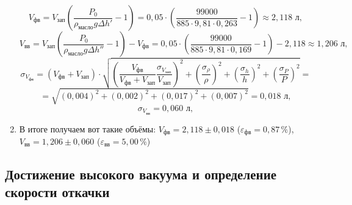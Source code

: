 \documentclass[a4paper,12pt]{article}
\begin{document}
\begin{enumerate}
    \begin{equation*}
    	V_\text{фв} = V_{\text{зап}} \left( \frac{P_0}{\rho_{\text{масло}} g \Delta h'} - 1 \right) = 0{,}05 \cdot \left( \frac{99000}{885 \cdot 9{,}81 \cdot 0{,}263} - 1 \right) \approx 2{,}118 \text{ л},
    \end{equation*}
    \begin{equation*}
    	V_\text{вв} = V_{\text{зап}} \left( \frac{P_0}{\rho_{\text{масло}} g \Delta h''} - 1 \right) - V_\text{фв} = 0{,}05 \cdot \left( \frac{99000}{885 \cdot 9{,}81 \cdot 0{,}169} - 1 \right) - 2{,}118 \approx  1{,}206 \text{ л},
    \end{equation*}
    \begin{equation*}
    \sigma_{V_\text{фв}} = \left(V_\text{фв} + V_{\text{зап}}\right) \cdot \sqrt{ \left( \frac{V_\text{фв}}{V_\text{фв} + V_{\text{зап}}} \frac{\sigma_{V_{\text{зап}}}}{V_{\text{зап}}} \right)^2 + \left( \frac{\sigma_\rho}{\rho} \right)^2 + \left( \frac{\sigma_h}{h} \right)^2 + \left( \frac{\sigma_P}{P} \right)^2 } =
    \end{equation*}
    \begin{equation*}
    = \sqrt{ \left( 0{,}004 \right)^2 + \left( 0{,}002 \right)^2 + \left( 0{,}017 \right)^2 + \left( 0{,}007 \right)^2 } = 0{,}018 \text{ л},
    \end{equation*}
    \begin{equation*}
    \sigma_{V_\text{вв}}  = 0{,}060 \text{ л},
    \end{equation*}
    
    \item В итоге получаем вот такие объёмы: $V_\text{фв} = 2{,}118 \pm 0{,}018$ ($\varepsilon_\text{фв} = 0{,}87\,\%$), $V_\text{вв} = 1{,}206 \pm 0{,}060$ ($\varepsilon_\text{вв} = 5{,}00\,\%$)
    
    
    \end{enumerate}

\subsection{Достижение высокого вакуума и определение скорости откачки}
\end{document}
